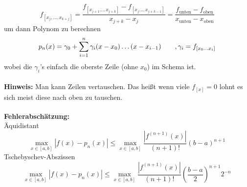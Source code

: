 \documentclass[
ngerman,
accentcolor=9c,%
type=intern,
marginpar=false
]{tudapub}
\begin{document}
            \begin{equation*}
                f_{[x_j,\dots,x_{k+j}]} = \dfrac{f_{[x_{j+1} \dots, x_{j+k}]} - f_{[x_{j} \dots, x_{j+k-1}]}}{x_{j+k} - x_j} = \dfrac{f_{\text{unten}} - f_{\text{oben}}}{x_{\text{unten}} - x_{\text{oben}}}
            \end{equation*}
            um dann Polynom zu berechnen
            \begin{equation*}
                p_n(x) = \gamma_0 + \sum_{i=1}^{n} \gamma_i (x-x_0) \dots (x-x_{i-1}) \tag*{$, \gamma_i = f_{[x_0 \dots x_i]}$}
            \end{equation*}
            wobei die $\gamma_i$'s einfach die oberste Zeile (ohne $x_0$) im Schema ist.\\
            \\
            \textbf{Hinweis:} Man kann Zeilen vertauschen. Das heißt wenn viele $f_{[x]} = 0$ lohnt es sich meist diese nach oben zu tauschen.\\
    \\ %
            \textbf{Fehlerabschätzung:}\\
            Äquidistant
            \begin{equation*}
                \max_{x \in [a,b]} |f(x) - p_n(x)| \leq \max_{x \in [a,b]} \dfrac{|f^{(n+1)}(x)|}{(n+1)!}(b-a)^{n+1}
            \end{equation*}
            Tschebyschev-Abszissen
            \begin{equation*}
                \max_{x \in [a,b]} |f(x) - p_n(x)| \leq \max_{x \in [a,b]} \dfrac{|f^{(n+1)}(x)|}{(n+1)!}\left(\dfrac{b-a}{2}\right)^{n+1}2^{-n}
            \end{equation*}
\end{document}
